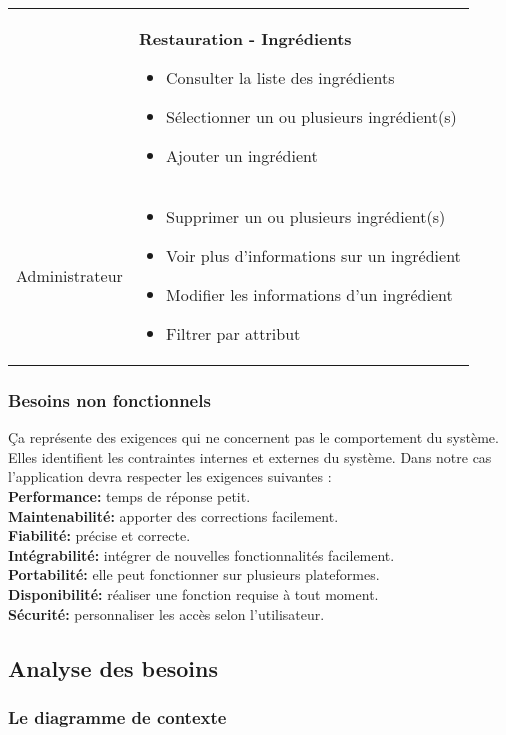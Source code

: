 \begin{longtable}{|Z{3cm}|L{10cm}|}
    &
    \textbf{Restauration - Ingrédients}
    \begin{itemize}
        \item Consulter la liste des ingrédients
        \item Sélectionner un ou plusieurs ingrédient(s)
        \item Ajouter un ingrédient
    \end{itemize}\\
    Administrateur&    
    \begin{itemize}
        \item Supprimer un ou plusieurs ingrédient(s)
        \item Voir plus d'informations sur un ingrédient
        \item Modifier les informations d'un ingrédient
        \item Filtrer par attribut
    \end{itemize}
\end{longtable}


\subsubsection{Besoins non fonctionnels}
Ça représente des exigences qui ne concernent pas le comportement du système. Elles identifient les contraintes internes et externes du système. Dans notre cas l’application devra respecter les exigences suivantes :\\

\noindent \textbf{Performance:} temps de réponse petit.\\
\textbf{Maintenabilité:} apporter des corrections facilement.\\
\textbf{Fiabilité:} précise et correcte.\\
\textbf{Intégrabilité:} intégrer de nouvelles fonctionnalités facilement.\\
\textbf{Portabilité:} elle peut fonctionner sur plusieurs plateformes.\\
\textbf{Disponibilité:} réaliser une fonction requise à tout moment.\\
\textbf{Sécurité:} personnaliser les accès selon l’utilisateur.\\


\subsection{Analyse des besoins}
\subsubsection{Le diagramme de contexte}
